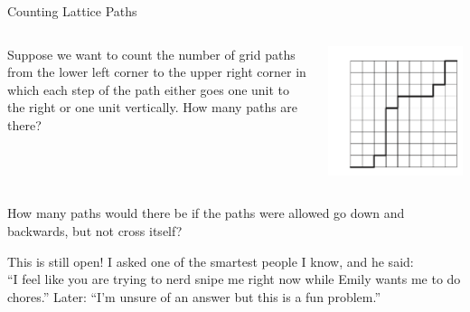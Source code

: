 \documentclass[10pt]{beamer}
\begin{document}
\begin{frame}{Counting Lattice Paths}
\footnotesize 
\begin{mygreenbox}[title= \text{Original Problem}]
%
\begin{columns}
\begin{column}{.4\textwidth}
 Suppose we want to count the number of grid paths from the lower left corner to the upper right corner in which each step of the path either goes one unit to the right or one unit vertically. How many paths are there?
\end{column}
\hfill 
\begin{column}{.4\textwidth}
\begin{center}
\includegraphics[width=.7\textwidth]{images/lattice_paths.png}
\end{center}	
\end{column}
\end{columns}


%
\end{mygreenbox}

\vfill 
\begin{myyellowbox}[title= \text{Erik's Problem}] How many paths would there be if the paths were allowed go  down and backwards, but not cross itself?	
\end{myyellowbox}
\vfill 
\begin{myredbox}[title= \text{Status}] This is still open!  I asked one of the smartest people I know, and he said:\\ 

\enquote{I feel like you are trying to nerd snipe me right now while Emily wants me to do chores.}  Later:  \enquote{I’m unsure of an answer but this is a fun problem.} 
\end{myredbox}

\end{frame}
\end{document}
